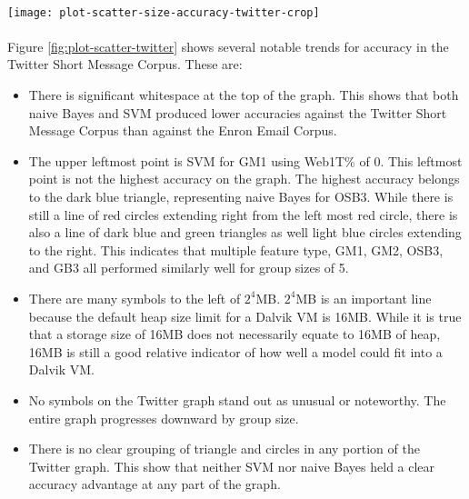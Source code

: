 \paragraph*{}
	\begin{sidewaysfigure}[htbp!]
		\begin{center}
		\centering
		\texttt{[image: plot-scatter-size-accuracy-twitter-crop]}
		\caption{Scatter-Plot of Twitter Short Message Corpus Tests}
		\label{fig:plot-scatter-twitter}
		\end{center}
	\end{sidewaysfigure}

\paragraph*{} Figure \ref{fig:plot-scatter-twitter} shows several notable trends for accuracy in the Twitter Short Message Corpus.  These are:
	\begin{itemize}
		\item There is significant whitespace at the top of the graph.  This shows that both naive Bayes and SVM produced lower accuracies against the Twitter Short Message Corpus than against the Enron Email Corpus.
		\item The upper leftmost point is SVM for GM1 using Web1T\% of 0.  This leftmost point is not the highest accuracy on the graph.  The highest accuracy belongs to the dark blue triangle, representing naive Bayes for OSB3.  While there is still a line of red circles extending right from the left most red circle, there is also a line of dark blue and green triangles as well light blue circles extending to the right.  This indicates that multiple feature type, GM1, GM2, OSB3, and GB3 all performed similarly well for group sizes of 5.
		\item There are many symbols to the left of $2^4$MB. $2^4$MB is an important line because the default heap size limit for a Dalvik VM is 16MB.  While it is true that a storage size of 16MB does not necessarily equate to 16MB of heap, 16MB is still a good relative indicator of how well a model could fit into a Dalvik VM.
		\item No symbols on the Twitter graph stand out as unusual or noteworthy.  The entire graph progresses downward by group size.
		\item There is no clear grouping of triangle and circles in any portion of the Twitter graph. This show that neither SVM nor naive Bayes held a clear accuracy advantage at any part of the graph.
		
	\end{itemize}

